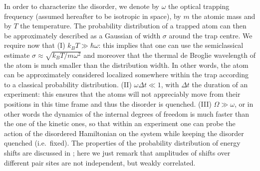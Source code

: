 \documentclass[prl,aps,twocolumn,showpacs,superscriptaddress,longbibliography]{revtex4-1}
\begin{document}
In order to characterize the disorder, we denote by $\omega$ the optical trapping frequency (assumed hereafter to be isotropic in space), by $m$ the atomic mass and by $T$ the temperature. The probability distribution of a trapped atom can then be approximately described as a Gaussian of width $\sigma$ around the trap centre. We require now that (I) $k_B T \gg \hbar \omega$: this implies that one can use the semiclassical estimate $\sigma \approx \sqrt{k_B T / m\omega^2}$ and moreover that the thermal de Broglie wavelength of the atom is much smaller than the distribution width. In other words, the atom can be approximately considered localized somewhere within the trap according to a classical probability distribution. (II) $\omega \Delta t \ll 1$, with $\Delta t$ the duration of an experiment: this ensures that the atoms will not appreciably move from their positions in this time frame and thus the disorder is quenched. (III) $\Omega \gg \omega$, or in other words the dynamics of the internal degrees of freedom is much faster than the one of the kinetic ones, so that within an experiment one can probe the action of the disordered Hamiltonian on the system while keeping the disorder quenched (i.e.~fixed). The properties of the probability distribution of energy shifts are discussed in \cite{SM}; here we just remark that amplitudes of shifts over different pair sites are not independent, but weakly correlated.


\end{document}

